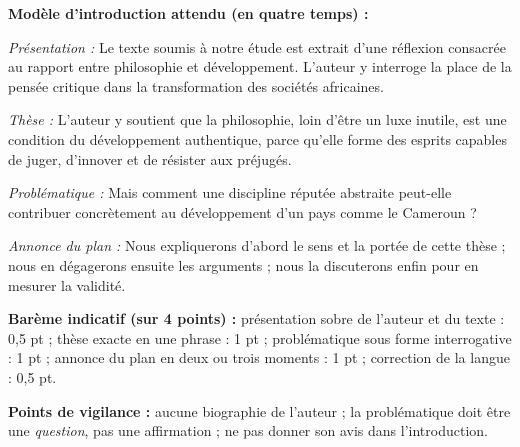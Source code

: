 \documentclass[11pt]{article}
\begin{document}
\begin{corrige}
\textbf{Modèle d'introduction attendu (en quatre temps) :}

\emph{Présentation :} Le texte soumis à notre étude est extrait d'une réflexion consacrée au rapport entre philosophie et développement. L'auteur y interroge la place de la pensée critique dans la transformation des sociétés africaines.

\emph{Thèse :} L'auteur y soutient que la philosophie, loin d'être un luxe inutile, est une condition du développement authentique, parce qu'elle forme des esprits capables de juger, d'innover et de résister aux préjugés.

\emph{Problématique :} Mais comment une discipline réputée abstraite peut-elle contribuer concrètement au développement d'un pays comme le Cameroun ?

\emph{Annonce du plan :} Nous expliquerons d'abord le sens et la portée de cette thèse ; nous en dégagerons ensuite les arguments ; nous la discuterons enfin pour en mesurer la validité.

\textbf{Barème indicatif (sur 4 points) :} présentation sobre de l'auteur et du texte : 0,5 pt ; thèse exacte en une phrase : 1 pt ; problématique sous forme interrogative : 1 pt ; annonce du plan en deux ou trois moments : 1 pt ; correction de la langue : 0,5 pt.

\textbf{Points de vigilance :} aucune biographie de l'auteur ; la problématique doit être une \emph{question}, pas une affirmation ; ne pas donner son avis dans l'introduction.
\end{corrige}
\end{document}
